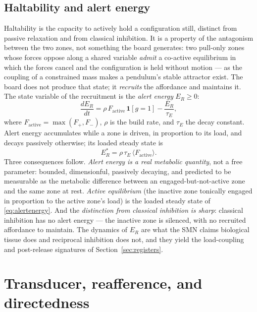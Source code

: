 \documentclass[utf8]{FrontiersinHarvard}
\begin{document}
\subsection{Haltability and alert energy}\label{sec:halt}
Haltability is the capacity to actively hold a configuration still, distinct from passive relaxation and from classical inhibition. It is a property of the antagonism between the two zones, not something the board generates: two pull-only zones whose forces oppose along a shared variable \emph{admit} a co-active equilibrium in which the forces cancel and the configuration is held without motion --- as the coupling of a constrained mass makes a pendulum's stable attractor exist. The board does not produce that state; it \emph{recruits} the affordance and maintains it. The state variable of the recruitment is the \emph{alert energy} $E_R\geq 0$:
\begin{equation}
\frac{dE_R}{dt} = \rho\,F_{\text{active}}\,\mathbf{1}[g=1] - \frac{E_R}{\tau_E}, \label{eq:alertenergy}
\end{equation}
where $F_{\text{active}}=\max(F_+,F_-)$, $\rho$ is the build rate, and $\tau_E$ the decay constant. Alert energy accumulates while a zone is driven, in proportion to its load, and decays passively otherwise; its loaded steady state is
\begin{equation}
E_R^* = \rho\,\tau_E\,\langle F_{\text{active}}\rangle. \label{eq:Estar}
\end{equation}
Three consequences follow. \emph{Alert energy is a real metabolic quantity}, not a free parameter: bounded, dimensionful, passively decaying, and predicted to be measurable as the metabolic difference between an engaged-but-not-active zone and the same zone at rest. \emph{Active equilibrium} (the inactive zone tonically engaged in proportion to the active zone's load) is the loaded steady state of \eqref{eq:alertenergy}. And the \emph{distinction from classical inhibition is sharp}: classical inhibition has no alert energy --- the inactive zone is silenced, with no recruited affordance to maintain. The dynamics of $E_R$ are what the SMN claims biological tissue does and reciprocal inhibition does not, and they yield the load-coupling and post-release signatures of Section~\ref{sec:registers}.

\section{Transducer, reafference, and directedness}\label{sec:reafference}
\end{document}
